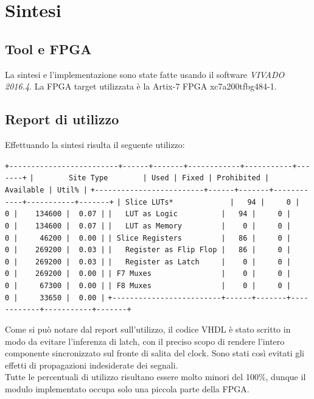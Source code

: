 \documentclass{article}
\begin{document}
\newpage
\section{Sintesi}

\subsection{Tool e FPGA}
La sintesi e l’implementazione sono state fatte usando il software \textit{VIVADO 2016.4}. La FPGA target utilizzata è la Artix-7 FPGA xc7a200tfbg484-1.

\subsection{Report di utilizzo}
Effettuando la sintesi risulta il seguente utilizzo:
\begin{center}
    \verb=+-------------------------+------+-------+------------+-----------+-------+=
    \verb=|        Site Type        | Used | Fixed | Prohibited | Available | Util% |=
    \verb=+-------------------------+------+-------+------------+-----------+-------+=
    \verb=| Slice LUTs*             |   94 |     0 |          0 |    134600 |  0.07 |=
    \verb=|   LUT as Logic          |   94 |     0 |          0 |    134600 |  0.07 |=
    \verb=|   LUT as Memory         |    0 |     0 |          0 |     46200 |  0.00 |=
    \verb=| Slice Registers         |   86 |     0 |          0 |    269200 |  0.03 |=
    \verb=|   Register as Flip Flop |   86 |     0 |          0 |    269200 |  0.03 |=
    \verb=|   Register as Latch     |    0 |     0 |          0 |    269200 |  0.00 |=
    \verb=| F7 Muxes                |    0 |     0 |          0 |     67300 |  0.00 |=
    \verb=| F8 Muxes                |    0 |     0 |          0 |     33650 |  0.00 |=
    \verb=+-------------------------+------+-------+------------+-----------+-------+=
\end{center}
Come si può notare dal report sull'utilizzo, il codice VHDL è stato scritto in modo da evitare l’inferenza di latch, con il preciso scopo di rendere l’intero componente sincronizzato sul fronte di salita del clock. Sono stati così evitati gli effetti di propagazioni indesiderate dei segnali. \\
Tutte le percentuali di utilizzo risultano essere molto minori del 100\%, dunque il modulo implementato occupa solo una piccola parte della FPGA.
\end{document}
